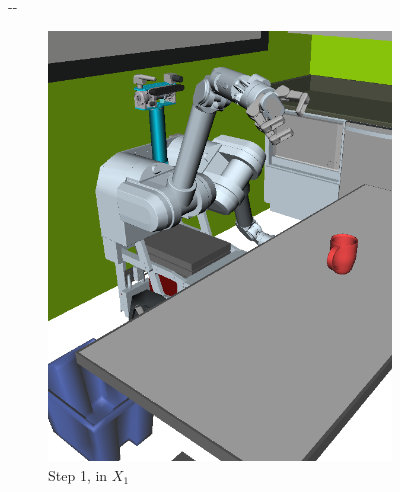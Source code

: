 \documentclass{report}
\newlength{\offsetpage}
\newenvironment{widepage}
   {\begin{adjustwidth}{-\offsetpage}{-\offsetpage}%
    \addtolength{\textwidth}{2\offsetpage}}%
{\end{adjustwidth}}
\begin{document}
\begin{figure}
\begin{widepage}
\begin{subfigure}[t]{0.185\linewidth}
\includegraphics[width=\columnwidth]{figs/testherb-b.png}
\caption{Step 1, in $X_1$}
\end{subfigure}
\begin{subfigure}[t]{0.185\linewidth}
\centering

\end{subfigure}
\end{widepage}
\end{figure}
\end{document}
